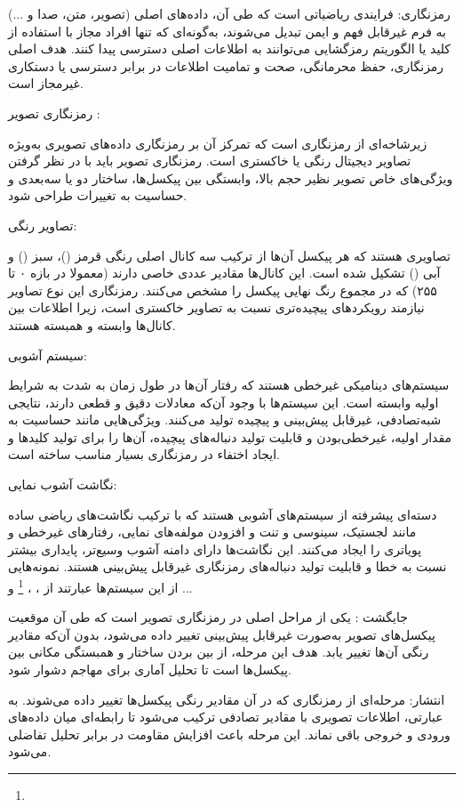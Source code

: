 رمزنگاری:
فرایندی ریاضیاتی است که طی آن، داده‌های اصلی (تصویر، متن، صدا و ...) به فرم غیرقابل فهم و ایمن تبدیل می‌شوند، به‌گونه‌ای که تنها افراد مجاز با استفاده از کلید یا الگوریتم رمزگشایی می‌توانند به اطلاعات اصلی دسترسی پیدا کنند. هدف اصلی رمزنگاری، حفظ محرمانگی، صحت و تمامیت اطلاعات در برابر دسترسی یا دستکاری غیرمجاز است.

رمزنگاری تصویر :

زیرشاخه‌ای از رمزنگاری است که تمرکز آن بر رمزنگاری داده‌های تصویری به‌ویژه تصاویر دیجیتال رنگی یا خاکستری است. رمزنگاری تصویر باید با در نظر گرفتن ویژگی‌های خاص تصویر نظیر حجم بالا، وابستگی بین پیکسل‌ها، ساختار دو یا سه‌بعدی و حساسیت به تغییرات طراحی شود.

تصاویر رنگی:

تصاویری هستند که هر پیکسل آن‌ها از ترکیب سه کانال اصلی رنگی قرمز ()، سبز () و آبی () تشکیل شده است. این کانال‌ها مقادیر عددی خاصی دارند (معمولا در بازه ۰ تا ۲۵۵) که در مجموع رنگ نهایی پیکسل را مشخص می‌کنند. رمزنگاری این نوع تصاویر نیازمند رویکردهای پیچیده‌تری نسبت به تصاویر خاکستری است، زیرا اطلاعات بین کانال‌ها وابسته و همبسته هستند.

سیستم آشوبی:

سیستم‌های دینامیکی غیرخطی هستند که رفتار آن‌ها در طول زمان به شدت به شرایط اولیه وابسته است. این سیستم‌ها با وجود آن‌که معادلات دقیق و قطعی دارند، نتایجی شبه‌تصادفی، غیرقابل پیش‌بینی و پیچیده تولید می‌کنند. ویژگی‌هایی مانند حساسیت به مقدار اولیه، غیرخطی‌بودن و قابلیت تولید دنباله‌های پیچیده، آن‌ها را برای تولید کلیدها و ایجاد اختفاء در رمزنگاری بسیار مناسب ساخته است.

نگاشت آشوب نمایی:

دسته‌ای پیشرفته از سیستم‌های آشوبی هستند که با ترکیب نگاشت‌های ریاضی ساده مانند لجستیک، سینوسی و تنت و افزودن مولفه‌های نمایی، رفتارهای غیرخطی و پویاتری را ایجاد می‌کنند. این نگاشت‌ها دارای دامنه آشوب وسیع‌تر، پایداری بیشتر نسبت به خطا و قابلیت تولید دنباله‌های رمزنگاری غیرقابل پیش‌بینی هستند. نمونه‌هایی از این سیستم‌ها عبارتند از ، ، \footnote{}  و ...

جایگشت :
یکی از مراحل اصلی در رمزنگاری تصویر است که طی آن موقعیت پیکسل‌های تصویر به‌صورت غیرقابل پیش‌بینی تغییر داده می‌شود، بدون آن‌که مقادیر رنگی آن‌ها تغییر یابد. هدف این مرحله، از بین بردن ساختار و همبستگی مکانی بین پیکسل‌ها است تا تحلیل آماری برای مهاجم دشوار شود.

انتشار:
مرحله‌ای از رمزنگاری که در آن مقادیر رنگی پیکسل‌ها تغییر داده می‌شوند. به عبارتی، اطلاعات تصویری با مقادیر تصادفی ترکیب می‌شود تا رابطه‌ای میان داده‌های ورودی و خروجی باقی نماند. این مرحله باعث افزایش مقاومت در برابر تحلیل تفاضلی می‌شود.

